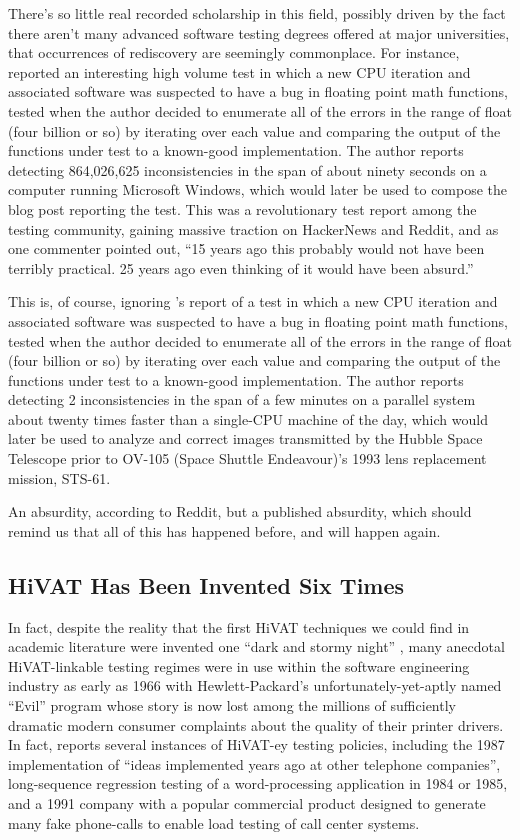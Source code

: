 There's so little real recorded scholarship in this field, possibly driven by the fact there aren't many advanced software testing degrees offered at major universities, that occurrences of rediscovery are seemingly commonplace. For instance, \citet{dawsonFourBillion} reported an interesting high volume test in which a new CPU iteration and associated software was suspected to have a bug in floating point math functions, tested when the author decided to enumerate all of the errors in the range of float (four billion or so) by iterating over each value and comparing the output of the functions under test to a known-good implementation. The author reports detecting 864,026,625 inconsistencies in the span of about ninety seconds on a computer running Microsoft Windows, which would later be used to compose the blog post reporting the test. This was a revolutionary test report among the testing community, gaining massive traction on HackerNews and Reddit, and as one commenter pointed out, ``15 years ago this probably would not have been terribly practical. 25 years ago even thinking of it would have been absurd.''

This is, of course, ignoring \citet{hoffman2003Exhausting}'s report of a test in which a new CPU iteration and associated software was suspected to have a bug in floating point math functions, tested when the author decided to enumerate all of the errors in the range of float (four billion or so) by iterating over each value and comparing the output of the functions under test to a known-good implementation. The author reports detecting 2 inconsistencies in the span of a few minutes on a parallel system about twenty times faster than a single-CPU machine of the day, which would later be used to analyze and correct images transmitted by the Hubble Space Telescope prior to OV-105 (Space Shuttle Endeavour)'s 1993 lens replacement mission, STS-61.

An absurdity, according to Reddit, but a published absurdity, which should remind us that all of this has happened before, and will happen again.

\subsection{HiVAT Has Been Invented Six Times}
In fact, despite the reality that the first HiVAT techniques we could find in academic literature were invented one ``dark and stormy night'' \citep{miller1989TR830}, many anecdotal HiVAT-linkable testing regimes were in use within the software engineering industry as early as 1966 with Hewlett-Packard's unfortunately-yet-aptly named ``Evil'' program whose story is now lost among the millions of sufficiently dramatic modern consumer complaints about the quality of their printer drivers. In fact, \citet{KanerHivatOverview} reports several instances of HiVAT-ey testing policies, including the 1987 implementation of ``ideas implemented years ago at other telephone companies'', long-sequence regression testing of a word-processing application in 1984 or 1985, and a 1991 company with a popular commercial product designed to generate many fake phone-calls to enable load testing of call center systems.

